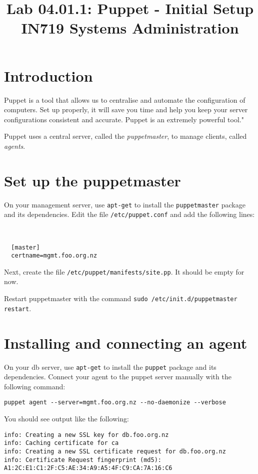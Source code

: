 \documentclass{article}
\begin{document}
\title{Lab 04.01.1: Puppet - Initial Setup \\ IN719 Systems Administration}
\date{}
\maketitle

\section*{Introduction}
Puppet is a tool that allows us to centralise and automate the configuration of computers.  Set up properly, it will save you time and help you keep your server configurations consistent and accurate.  Puppet is an extremely powerful tool."

Puppet uses a central server, called the \emph{puppetmaster}, to manage clients, called \emph{agents}.

\section{Set up the puppetmaster}
On your management server, use \texttt{apt-get} to install the \texttt{puppetmaster} package and its dependencies.  Edit the file \texttt{/etc/puppet.conf} and add the following lines:

\
\begin{verbatim}
  [master]
  certname=mgmt.foo.org.nz
\end{verbatim}

Next, create the file \texttt{/etc/puppet/manifests/site.pp}.  It should be empty for now.

Restart puppetmaster with the command \texttt{sudo /etc/init.d/puppetmaster restart}.

\section{Installing and connecting an agent}
On your db server, use \texttt{apt-get} to install the \texttt{puppet} package and its dependencies.  Connect your agent to the puppet server manually with the following command:

\begin{verbatim}
puppet agent --server=mgmt.foo.org.nz --no-daemonize --verbose
\end{verbatim}

You should see output like the following:

\begin{verbatim}
info: Creating a new SSL key for db.foo.org.nz
info: Caching certificate for ca
info: Creating a new SSL certificate request for db.foo.org.nz
info: Certificate Request fingerprint (md5): A1:2C:E1:C1:2F:C5:AE:34:A9:A5:4F:C9:CA:7A:16:C6

\end{verbatim}
\end{document}
